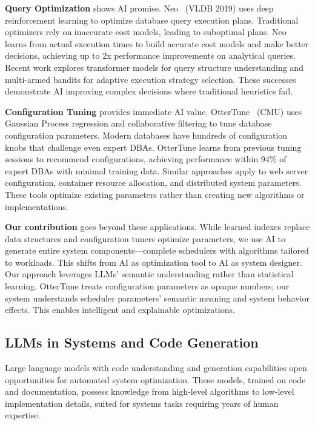 \textbf{Query Optimization} shows AI promise. Neo~\cite{marcus2019neo} (VLDB 2019) uses deep reinforcement learning to optimize database query execution plans. Traditional optimizers rely on inaccurate cost models, leading to suboptimal plans. Neo learns from actual execution times to build accurate cost models and make better decisions, achieving up to 2x performance improvements on analytical queries. Recent work explores transformer models for query structure understanding and multi-armed bandits for adaptive execution strategy selection. These successes demonstrate AI improving complex decisions where traditional heuristics fail.

\textbf{Configuration Tuning} provides immediate AI value. OtterTune~\cite{vanaken2017ottertune} (CMU) uses Gaussian Process regression and collaborative filtering to tune database configuration parameters. Modern databases have hundreds of configuration knobs that challenge even expert DBAs. OtterTune learns from previous tuning sessions to recommend configurations, achieving performance within 94\% of expert DBAs with minimal training data. Similar approaches apply to web server configuration, container resource allocation, and distributed system parameters. These tools optimize existing parameters rather than creating new algorithms or implementations.

\textbf{Our contribution} goes beyond these applications. While learned indexes replace data structures and configuration tuners optimize parameters, we use AI to generate entire system components—complete schedulers with algorithms tailored to workloads. This shifts from AI as optimization tool to AI as system designer. Our approach leverages LLMs' semantic understanding rather than statistical learning. OtterTune treats configuration parameters as opaque numbers; our system understands scheduler parameters' semantic meaning and system behavior effects. This enables intelligent and explainable optimizations.

\subsection{LLMs in Systems and Code Generation}

Large language models with code understanding and generation capabilities open opportunities for automated system optimization. These models, trained on code and documentation, possess knowledge from high-level algorithms to low-level implementation details, suited for systems tasks requiring years of human expertise.


